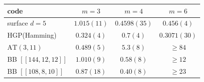 \begin{tabular}{lccc}
\toprule
code & $m=3$ & $m=4$ & $m=6$ \\
\midrule
surface $d=5$ & $1.015(11)$ & $0.4598(35)$ & $0.456(4)$ \\
HGP(Hamming) & $0.324(4)$ & $0.7(4)$ & $0.3071(30)$ \\
$\mathrm{AT}(3,11)$ & $0.489(5)$ & $5.3(8)$ & $\geq 84$ \\
BB $[[144,12,12]]$ & $1.010(9)$ & $0.58(8)$ & $\geq 12$ \\
BB $[[108,8,10]]$ & $0.87(18)$ & $0.40(8)$ & $\geq 23$ \\
\bottomrule
\end{tabular}

